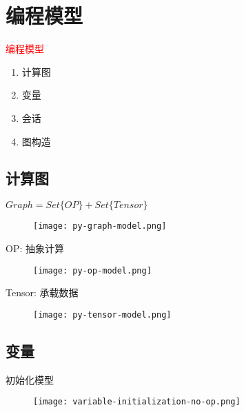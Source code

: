 \section{编程模型}
\label{sec:prog-model}

\begin{frame}
  \begin{center}
    \Huge{\textcolor{red}{编程模型}}
  \end{center}

  \begin{enumerate}
    \item \alert{计算图}
    \item \alert{变量}
    \item \alert{会话}
    \item \alert{图构造}    
  \end{enumerate}     
\end{frame}

\subsection{计算图}

\begin{frame}{$ Graph = Set\{OP\} + Set\{Tensor\} $}
  \begin{figure}
    \centering
    \texttt{[image: py-graph-model.png]}
  \end{figure}
\end{frame}

\begin{frame}{OP: 抽象计算}
  \begin{figure}
    \centering
    \texttt{[image: py-op-model.png]}
  \end{figure}
\end{frame}

\begin{frame}{Tensor: 承载数据}
  \begin{figure}
    \centering
    \texttt{[image: py-tensor-model.png]}
  \end{figure}
\end{frame}

\subsection{变量}

\begin{frame}{初始化模型}
  \begin{figure}
    \centering
    \texttt{[image: variable-initialization-no-op.png]}
  \end{figure}
\end{frame}


